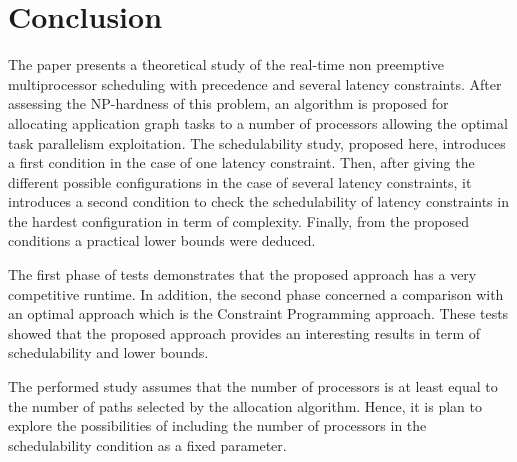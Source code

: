 \documentclass{ijcaArticle}
\begin{document}
\section{Conclusion} The paper presents a theoretical study of the real-time non preemptive multiprocessor scheduling with precedence and several latency constraints. After assessing the NP-hardness of this problem, an algorithm is proposed for allocating application graph tasks to a number of processors allowing the optimal task parallelism exploitation. 
The schedulability study, proposed here, introduces a first condition in the case of one latency constraint. Then, after giving the different possible configurations in the case of several latency constraints, it introduces a second condition to check the schedulability of latency constraints in the hardest configuration in term of complexity. Finally, from the proposed conditions a practical lower bounds were deduced.       

The first phase of tests demonstrates that the proposed approach has a very competitive runtime. In addition, the second phase concerned a comparison with an optimal approach which is the Constraint Programming approach. These tests showed that the proposed approach provides an interesting results in term of schedulability and lower bounds.     

The performed study assumes that the number of processors is at least equal to the number of paths selected by the allocation algorithm. Hence, it is plan to explore the possibilities
of including the number of processors in the schedulability condition as a fixed parameter.


    


 

\end{document}
